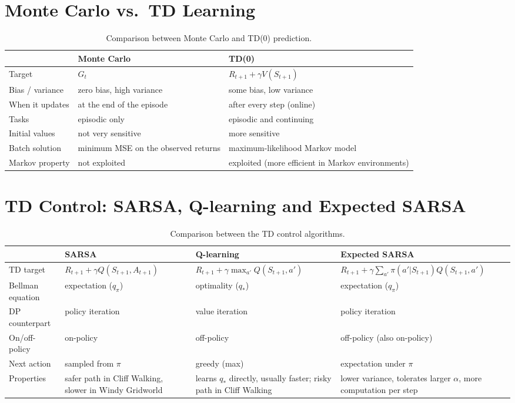 \section{Monte Carlo vs.\ TD Learning}
\begin{table}[H]
\centering
\small
\begin{tabularx}{\textwidth}{@{}l >{\raggedright\arraybackslash}X >{\raggedright\arraybackslash}X@{}}
\toprule
 & \textbf{Monte Carlo} & \textbf{TD(0)} \\
\midrule
Target & $G_t$ & $R_{t+1}+\gamma V(S_{t+1})$ \\
Bias / variance & zero bias, high variance & some bias, low variance \\
When it updates & at the end of the episode & after every step (online) \\
Tasks & episodic only & episodic and continuing \\
Initial values & not very sensitive & more sensitive \\
Batch solution & minimum MSE on the observed returns & maximum-likelihood Markov model \\
Markov property & not exploited & exploited (more efficient in Markov environments) \\
\bottomrule
\end{tabularx}
\caption{Comparison between Monte Carlo and TD(0) prediction.}
\label{tab:mc-vs-td}
\end{table}

\section{TD Control: SARSA, Q-learning and Expected SARSA}
\begin{table}[H]
\centering
\footnotesize
\begin{tabularx}{\textwidth}{@{}l >{\raggedright\arraybackslash}X >{\raggedright\arraybackslash}X >{\raggedright\arraybackslash}X@{}}
\toprule
 & \textbf{SARSA} & \textbf{Q-learning} & \textbf{Expected SARSA} \\
\midrule
TD target & $R_{t+1}+\gamma Q(S_{t+1},A_{t+1})$ & $R_{t+1}+\gamma\max_{a'}Q(S_{t+1},a')$ & $R_{t+1}+\gamma\sum_{a'}\pi(a'|S_{t+1})Q(S_{t+1},a')$ \\
Bellman equation & expectation ($q_\pi$) & optimality ($q_*$) & expectation ($q_\pi$) \\
DP counterpart & policy iteration & value iteration & policy iteration \\
On/off-policy & on-policy & off-policy & off-policy (also on-policy) \\
Next action & sampled from $\pi$ & greedy (max) & expectation under $\pi$ \\
Properties & safer path in Cliff Walking, slower in Windy Gridworld & learns $q_*$ directly, usually faster; risky path in Cliff Walking & lower variance, tolerates larger $\alpha$, more computation per step \\
\bottomrule
\end{tabularx}
\caption{Comparison between the TD control algorithms.}
\label{tab:td-control}
\end{table}

